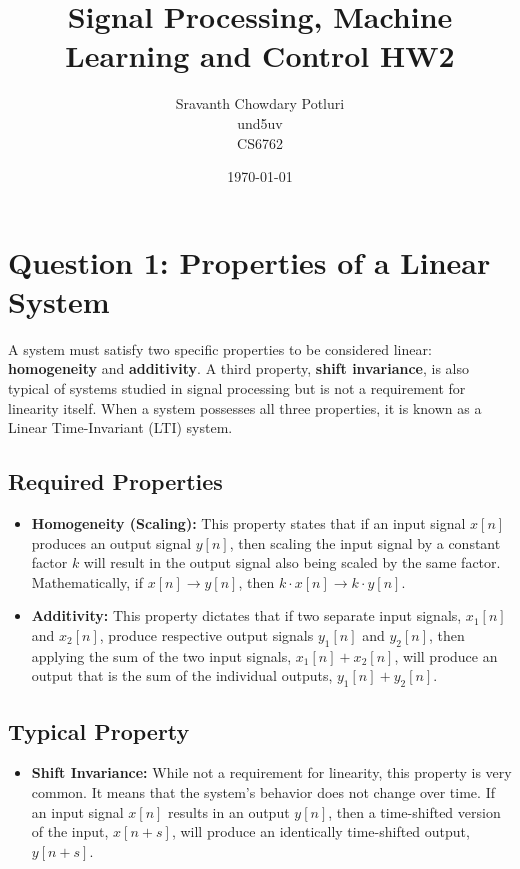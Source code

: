 \documentclass[a4paper,12pt]{article}
\title{Signal Processing, Machine Learning and Control HW2}
\author{Sravanth Chowdary Potluri \\ und5uv \\ CS6762}
\date{\today}
\begin{document}
\maketitle

\section{Question 1: Properties of a Linear System}
A system must satisfy two specific properties to be considered linear: \textbf{homogeneity} and \textbf{additivity}. A third property, \textbf{shift invariance}, is also typical of systems studied in signal processing but is not a requirement for linearity itself. When a system possesses all three properties, it is known as a Linear Time-Invariant (LTI) system.

\subsection*{Required Properties}
\begin{itemize}
    \item \textbf{Homogeneity (Scaling):} This property states that if an input signal $x[n]$ produces an output signal $y[n]$, then scaling the input signal by a constant factor $k$ will result in the output signal also being scaled by the same factor. Mathematically, if $x[n] \rightarrow y[n]$, then $k \cdot x[n] \rightarrow k \cdot y[n]$.
    \item \textbf{Additivity:} This property dictates that if two separate input signals, $x_1[n]$ and $x_2[n]$, produce respective output signals $y_1[n]$ and $y_2[n]$, then applying the sum of the two input signals, $x_1[n] + x_2[n]$, will produce an output that is the sum of the individual outputs, $y_1[n] + y_2[n]$.
\end{itemize}

\subsection*{Typical Property}
\begin{itemize}
    \item \textbf{Shift Invariance:} While not a requirement for linearity, this property is very common. It means that the system's behavior does not change over time. If an input signal $x[n]$ results in an output $y[n]$, then a time-shifted version of the input, $x[n+s]$, will produce an identically time-shifted output, $y[n+s]$.
\end{itemize}
\end{document}
